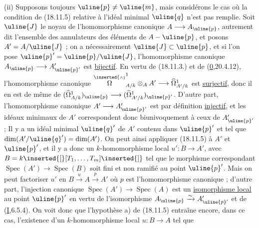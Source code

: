 (ii) Supposons toujours $\uline{p}\neq\uline{m}$, mais considérons le cas où la condition de (18.11.5) relative à  l'idéal minimal $\uline{q}$ n'est pas remplie. Soit $\uline{J}$ le noyau de l'homomorphisme canonique $A\longrightarrow A_{\uline{p}}$, autrement dit l'ensemble des annulateurs des éléments de $A-\uline{p}$, et posons $A'=A/\uline{J}$ ; on a nécessairement $\uline{J}\subset\uline{p}$, et si l'on pose $\uline{p}'=\uline{p}/\uline{J}$, l'homomorphisme canonique $A_{\uline{p}}\longrightarrow A'_{\uline{p}'}$ est \uline{bijectif}. En vertu de (18.11.3.) et de (\uline{0},20.4.12), l'homomorphisme canonique
$\overset{\inserted{\scriptscriptstyle\wedge}}{\Omega}^1_{A/k}\otimes_A A'\longrightarrow\widehat\Omega^1_{A'/k}$ est \uline{surjectif}, donc il en est de même de $(\widehat\Omega^1_{A/k})_{\uline{p}}\longrightarrow(\widehat\Omega^1_{A'/k})_{\uline{p}'}$. D'autre part, l'homomorphisme canonique $A'\longrightarrow A'_{\uline{p}'}$ est par définition \uline{injectif}, et les idéaux  minimaux de $A'$ correspondent donc biunivoquement à ceux de $A'_{\uline{p}'}$ ;  Il y a un idéal minimal $\uline{q}'$ de $A'$  contenu dans  $\uline{p}'$ et tel que $\dim(A'/\uline{q}')=\dim(A')$. On peut ainsi appliquer (18.11.5) à $A'$ et $\uline{p}'$, et il y a donc un $k$-homomorphisme local $u':B\longrightarrow A'$, avec $B=k\inserted{[}[T_1,\ldots,T_m]\inserted{]}$ tel que le morphisme correspondant $\operatorname{Spec}(A')\longrightarrow\operatorname{Spec}(B)$ soit fini et non ramifié au point $\uline{p}'$. Mais on peut factoriser $u'$ en $B\xrightarrow{u}A\xrightarrow{p}A'$ où  $p$ est l'homomorphisme canonique ; d'autre part, l'injection canonique $\operatorname{Spec}(A')\longrightarrow\operatorname{Spec}(A)$ est un  \uline{isomorphisme local} au point $\uline{p}'$ en vertu de l'isomorphisme $A_{\uline{p}}\xrightarrow{\sim}A'_{\uline{p}'}$ et de (\uline{I},6.5.4). On voit donc que l'hypothèse a) de (18.11.5) entraîne encore, dans ce cas, l'existence d'un $k$-homomorphisme local $u:B\longrightarrow A$ tel que


